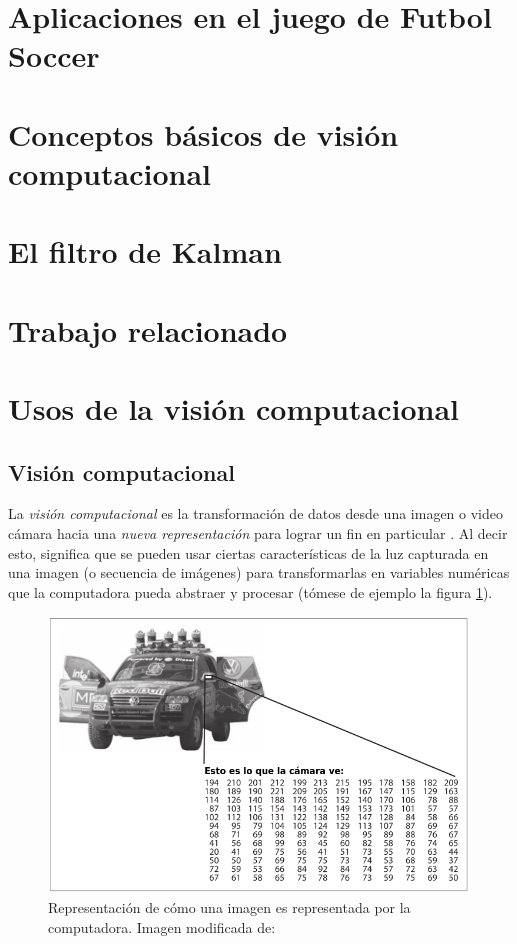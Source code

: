 	\section{Aplicaciones en el juego de Futbol Soccer}
	\section{Conceptos básicos de visión computacional}
	\section{El filtro de Kalman}
	\section{Trabajo relacionado}		


	\section{Usos de la visión computacional}
		\subsection*{Visión computacional}
	La \textit{visión computacional} es la transformación de datos desde una imagen o video cámara hacia una \textit{nueva representación} para lograr un fin en particular \cite{bradski2008learning}. Al decir esto, significa que se pueden usar ciertas características de la luz capturada en una imagen (o secuencia de imágenes) para transformarlas en variables numéricas que la computadora pueda abstraer y procesar (tómese de ejemplo la figura \ref{fig:camera_representation}).

\begin{figure}
\centering
\includegraphics[scale=0.6]{images/new_representation_image.png}
\caption{Representación de cómo una imagen es representada por la computadora. Imagen modificada de:}
\label{fig:camera_representation}
\end{figure}

